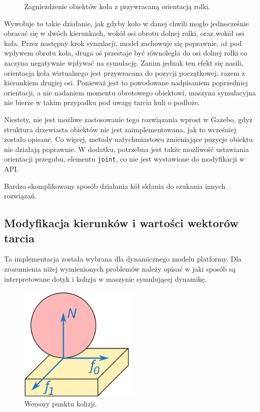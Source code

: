 		\begin{figure}[H]
		\caption{Zagnieżdżenie obiektów koła z przywracaną orientacją rolki.}
		\label{fig:vrep_wheel}
		\end{figure}

		Wywołuje to takie działanie, jak gdyby koło w danej chwili mogło jednocześnie obracać się w dwóch kierunkach, wokół osi obrotu dolnej rolki, oraz wokół osi koła.
		Przez następny krok symulacji, model zachowuje się poprawnie, aż pod wpływem obrotu koła, druga oś przestaje być równoległa do osi dolnej rolki
		co zaczyna negatywnie wpływać na symulację.
		Zanim jednak ten efekt się nasili, orientacja koła wirtualnego jest przywracana do pozycji początkowej, razem z kierunkiem drugiej osi.
		Ponieważ jest to powodowane nadpisaniem poprzedniej orientacji, a nie nadaniem momentu obrotowego obiektowi, 
		maszyna symulacyjna nie bierze w takim przypadku pod uwagę tarcia kuli o podłoże. 

		Niestety, nie jest możliwe zastosowanie tego rozwiązania wprost w Gazebo, gdyż struktura drzewiasta obiektów nie jest zaimplementowana, jak to wcześniej zostało opisane.
		Co więcej, metody natychmiastowo zmieniające pozycje obiektu nie działają poprawnie.
		W dodatku, potrzebna jest także możliwość ustawiania orientacji przegubu, elementu \texttt{joint}, co nie jest wystawione do modyfikacji w API.

		Bardzo skomplikowany sposób działania kół skłania do szukania innych rozwiązań.

	\subsection{Modyfikacja kierunków i wartości wektorów tarcia}
		\label{sec:friction}
		Ta implementacja została wybrana dla dynamicznego modelu platformy.
		Dla zrozumienia niżej wymienionych problemów należy opisać w jaki sposób są interpretowane dotyk i kolizja w maszynie symulującej dynamikę.

		\begin{figure}[h]
		\centering
		\includegraphics[width=0.5\textwidth]{graphics/friction.pdf}
		\caption{Wersory punktu kolizji.}
		\label{fig:ode_collision}
		\end{figure} 

